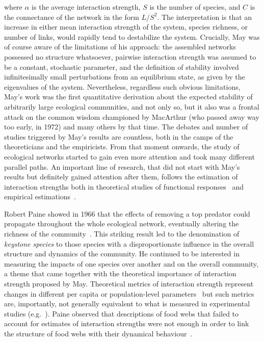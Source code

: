 where $\alpha$ is the average interaction strength, $S$ is the number of species, and $C$ is the connectance of the network in the form $L/S^2$. The interpretation is that an increase in either mean interaction strength of the system, species richness, or number of links, would rapidly tend to destabilize the system. Crucially, May was of course aware of the limitations of his approach: the assembled networks possessed no structure whatsoever, pairwise interaction strength was assumed to be a constant, stochastic parameter, and the definition of stability involved infinitesimally small perturbations from an equilibrium state, as given by the eigenvalues of the system. Nevertheless, regardless such obvious limitations, May's work was the first quantitative derivation about the expected stability of arbitrarily large ecological communities, and not only so, but it also was a frontal attack on the common wisdom championed by MacArthur (who passed away way too early, in 1972) and many others by that time. The debates and number of studies triggered by May's results are countless, both in the camps of the theoreticians and the empiricists. From that moment onwards, the study of ecological networks started to gain even more attention and took many different parallel paths. An important line of research, that did not start with May's results but definitely gained attention after them, follows the estimation of interaction strengths both in theoretical studies of functional responses~\citep{Holling1965} and empirical estimations~\citep{Bender1984}.

Robert Paine showed in 1966 that the effects of removing a top predator could propagate throughout the whole ecological network, eventually altering the richness of the community~\citep{Paine1966}. This striking result led to the denomination of \textit{keystone species} to those species with a disproportionate influence in the overall structure and dynamics of the community. He continued to be interested in measuring the impacts of one species over another and on the overall community, a theme that came together with the theoretical importance of interaction strength proposed by May. Theoretical metrics of interaction strength represent changes in different per capita or population-level parameters~\citep{Laska1998} but such metrics are, importantly, not generally equivalent to what is measured in experimental studies (e.g.~\citealt{Bender1984}). Paine observed that descriptions of food webs that failed to account for estimates of interaction strengths were not enough in order to link the structure of food webs with their dynamical behaviour~\citep{Paine1992}.

